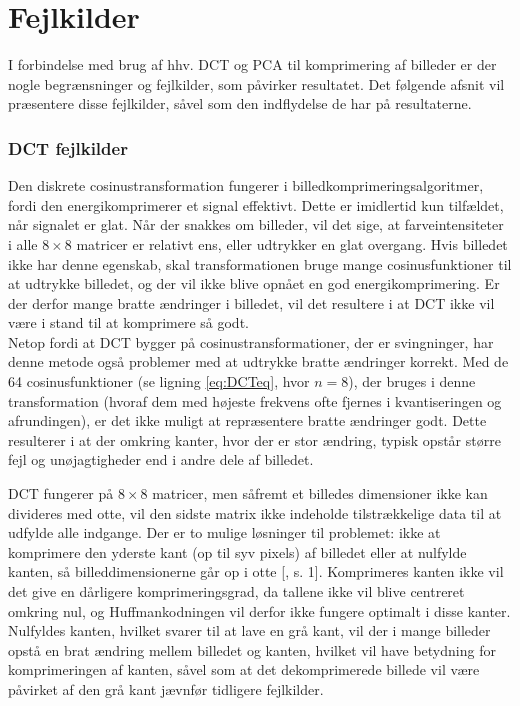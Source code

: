 \section{Fejlkilder}
I forbindelse med brug af hhv. DCT og PCA til komprimering af billeder er der nogle begrænsninger og fejlkilder, som påvirker resultatet. Det følgende afsnit vil præsentere disse fejlkilder, såvel som den indflydelse de har på resultaterne.

\subsubsection{DCT fejlkilder}
Den diskrete cosinustransformation fungerer i billedkomprimeringsalgoritmer, fordi den energikomprimerer et signal effektivt. Dette er imidlertid kun tilfældet, når signalet er glat. Når der snakkes om billeder, vil det sige, at farveintensiteter i alle $8 \times 8$ matricer er relativt ens, eller udtrykker en glat overgang. Hvis billedet ikke har denne egenskab, skal transformationen bruge mange cosinusfunktioner til at udtrykke billedet, og der vil ikke blive opnået en god energikomprimering. Er der derfor mange bratte ændringer i billedet, vil det resultere i at DCT ikke vil være i stand til at komprimere så godt. \\
Netop fordi at DCT bygger på cosinustransformationer, der er svingninger, har denne metode også problemer med at udtrykke bratte ændringer korrekt. Med de 64 cosinusfunktioner (se ligning \vref{eq:DCTeq}, hvor $n=8$), der bruges i denne transformation (hvoraf dem med højeste frekvens ofte fjernes i kvantiseringen og afrundingen), er det ikke muligt at repræsentere bratte ændringer godt. Dette resulterer i at der omkring kanter, hvor der er stor ændring, typisk opstår større fejl og unøjagtigheder end i andre dele af billedet.

DCT fungerer på $8 \times 8$ matricer, men såfremt et billedes dimensioner ikke kan divideres med otte, vil den sidste matrix ikke indeholde tilstrækkelige data til at udfylde alle indgange. Der er to mulige løsninger til problemet: ikke at komprimere den yderste kant (op til syv pixels) af billedet eller at nulfylde kanten, så billeddimensionerne går op i otte [\citet{zero_padding}, s. 1]. Komprimeres kanten ikke vil det give en dårligere komprimeringsgrad, da tallene ikke vil blive centreret omkring nul, og Huffmankodningen vil derfor ikke fungere optimalt i disse kanter. Nulfyldes kanten, hvilket svarer til at lave en grå kant, vil der i mange billeder opstå en brat ændring mellem billedet og kanten, hvilket vil have betydning for komprimeringen af kanten, såvel som at det dekomprimerede billede vil være påvirket af den grå kant jævnfør tidligere fejlkilder.

